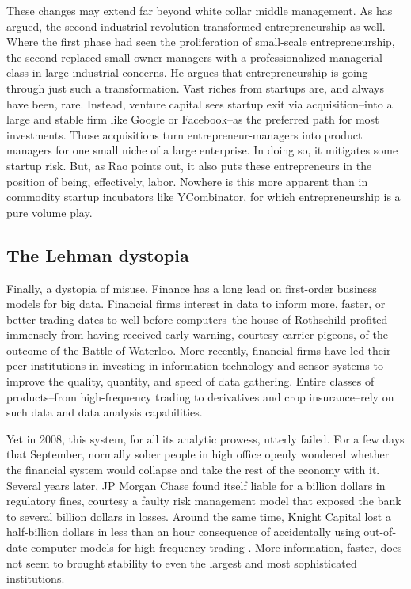 \documentclass[12pt]{article}
\begin{document}
These changes may extend far beyond white collar middle management. As
\cite{rao2012} has argued, the second industrial revolution
transformed entrepreneurship as well. Where the first phase had seen
the proliferation of small-scale entrepreneurship, the second replaced
small owner-managers with a professionalized managerial class in large
industrial concerns. He argues that entrepreneurship is going through
just such a transformation. Vast riches from startups are, and always
have been, rare. Instead, venture capital sees startup exit via
acquisition--into a large and stable firm like Google or Facebook--as
the preferred path for most investments. Those acquisitions turn
entrepreneur-managers into product managers for one small niche of a
large enterprise. In doing so, it mitigates some startup risk. But, as
Rao points out, it also puts these entrepreneurs in the position of
being, effectively, labor. Nowhere is this more apparent than in
commodity startup incubators like YCombinator, for which
entrepreneurship is a pure volume play.


\subsection{The Lehman dystopia}
\label{sec:lehman-dystopia}

Finally, a dystopia of misuse. Finance has a long lead on first-order
business models for big data. Financial firms interest in data to
inform more, faster, or better trading dates to well before
computers--the house of Rothschild profited immensely from having
received early warning, courtesy carrier pigeons, of the outcome of
the Battle of Waterloo. More recently, financial firms have led their
peer institutions in investing in information technology and sensor
systems to improve the quality, quantity, and speed of data
gathering. Entire classes of products--from high-frequency trading to
derivatives and crop insurance--rely on such data and data analysis
capabilities.

Yet in 2008, this system, for all its analytic prowess, utterly
failed. For a few days that September, normally sober people in
high office openly wondered whether the financial system would
collapse and take the rest of the economy with it. Several years
later, JP Morgan Chase found itself liable for a billion dollars in
regulatory fines, courtesy a faulty risk management model that exposed
the bank to several billion dollars in losses.\citep{kopecki2013} Around the same time,
Knight Capital lost a half-billion dollars in less than an hour
consequence of accidentally using out-of-date computer models for
high-frequency trading \citep{strasburg2012}. More information, faster, does not seem to
brought stability to even the largest and most sophisticated institutions.
\end{document}
